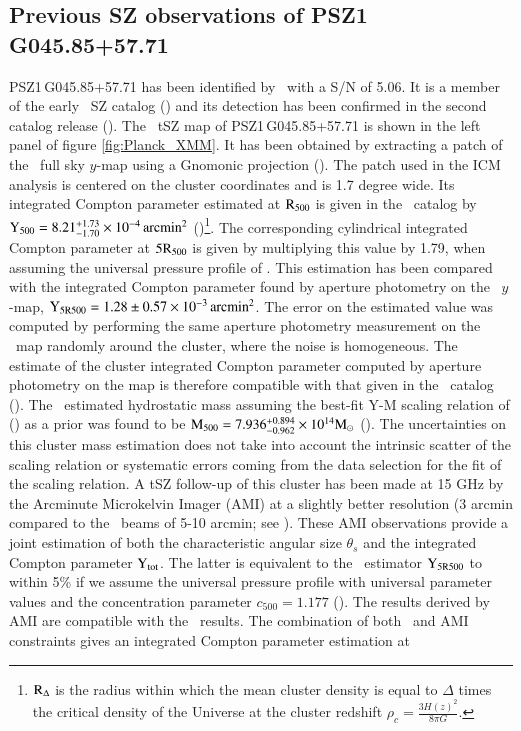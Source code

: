 \documentclass[traditabstract]{aa}
\begin{document}
\subsection{Previous SZ observations of \mbox{PSZ1\,G045.85+57.71}}\label{sec:previous_sz}
\mbox{PSZ1\,G045.85+57.71} has been identified by \planck\ with a S/N of 5.06. It is a member of the early \planck\ SZ catalog (\citealt{Planck_cata}) and its detection has been confirmed in the second catalog release (\citealt{Planck_cata2}).
The \planck\ tSZ map of \mbox{PSZ1\,G045.85+57.71} is shown in the left panel of figure \ref{fig:Planck_XMM}. It has been obtained by extracting a patch of the \planck\ full sky $y$-map using a Gnomonic projection (\citealt{ymap_planck}). The patch used in the ICM analysis is centered on the cluster coordinates and is 1.7 degree wide. Its integrated Compton parameter estimated at $\rm{R_{500}}$ is given in the \planck\ catalog by \mbox{$\rm{Y_{500}} = 8.21^{+1.73}_{-1.70} \times 10^{-4} \, \mathrm{arcmin^2}$} (\citealt{PSZ1_updated})\footnote{$\rm{R_{\Delta}}$ is the radius within which the mean cluster density is equal to $\Delta$ times the critical density of the Universe at the cluster redshift \mbox{$\rho_c = \frac{3H(z)^2}{8\pi G}$}.}. The corresponding cylindrical integrated Compton parameter at $\rm{5R_{500}}$ is given by multiplying this value by 1.79, when assuming the universal pressure profile of \citealt{universal}. This estimation has been compared with the integrated Compton parameter found by aperture photometry on the \planck\ $y$-map, \mbox{$\rm{Y_{5R500}} = 1.28\pm 0.57 \times 10^{-3} \, \mathrm{arcmin^2}$}. The error on the estimated value was computed by performing the same aperture photometry measurement on the \planck\ map randomly around the cluster, where the noise is homogeneous. The estimate of the cluster integrated Compton parameter computed by aperture photometry on the map is therefore compatible with that given in the \planck\ catalog (\citealt{PSZ1_updated}). The \planck\ estimated hydrostatic mass assuming the best-fit Y-M scaling relation of (\citealt{universal}) as a prior was found to be $\rm{M_{500}} = 7.936^{+0.894}_{-0.962} \times 10^{14}M_{\odot}$ (\citealt{PSZ1_updated}). The uncertainties on this cluster mass estimation does not take into account the intrinsic scatter of the scaling relation or systematic errors coming from the data selection for the fit of the scaling relation.  A tSZ follow-up of this cluster has been made at 15 GHz by the Arcminute Microkelvin Imager (AMI) at a slightly better resolution (3 arcmin compared to the \planck\ beams of 5-10 arcmin; see \citealt{AMI_followup}). These AMI observations provide a joint estimation of both the characteristic angular size $\theta_s$ and the integrated Compton parameter $\rm{Y_{tot}}$. The latter is equivalent to the \planck\ estimator $\rm{Y_{5R500}}$ to within 5\% if we assume the universal pressure profile with universal parameter values and the concentration parameter $c_{500} = 1.177$ (\citealt{universal,AMI_followup}). The results derived by AMI are compatible with the \planck\ results. The combination of both \planck\ and AMI constraints gives an integrated Compton parameter estimation at 
\end{document}
